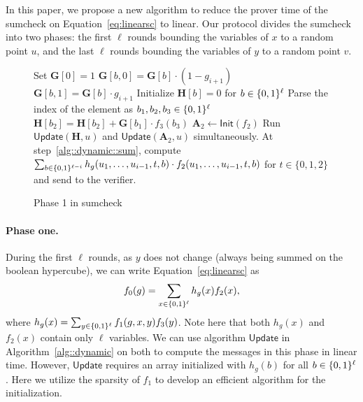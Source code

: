 In this paper, we propose a new algorithm to reduce the prover time of the sumcheck on Equation~\ref{eq:linearsc} to linear. Our protocol divides the sumcheck into two phases: the first $\ell$ rounds bounding the variables of $x$ to a random point $u$, and the last $\ell$ rounds bounding the variables of $y$ to a random point $v$.

\begin{figure}[b!]
	\begin{algorithm}[H]
		\caption{Phase 1 in sumcheck}\label{alg::phase1}
		\begin{algorithmic}[1]
			\State Set $\textbf{G}[0] = 1$
			\State $\textbf{G}[b,0] = \textbf{G}[b]\cdot(1-g_{i+1})$
			\State $\textbf{G}[b,1] = \textbf{G}[b]\cdot g_{i+1}$
			\EndFor
			\EndFor
			\EndProcedure
			\State Initialize $\textbf{H}[b] = 0$ for $b\in\{0,1\}^\ell$
			\State Parse the index of the element as $b_1,b_2,b_3\in\{0,1\}^\ell$
			\State\label{alg::phase1::init} $\textbf{H}[b_2] = \textbf{H}[b_2]+ \textbf{G}[b_1]\cdot f_3(b_3)$
			\EndFor
			\EndProcedure
			\State $\textbf{A}_2\leftarrow\mathsf{Init}(f_2)$
			\State Run $\mathsf{Update}(\textbf{H},u)$ and $\mathsf{Update}(\textbf{A}_2,u)$ simultaneously. At step~\ref{alg::dynamic::sum}, compute $\sum_{b\in\{0,1\}^{\ell-i}}h_g(u_1,\ldots, u_{i-1}, t, b)\cdot f_2(u_1,\ldots, u_{i-1}, t, b)$ for $t\in\{0,1,2\}$ and send to the verifier.
			\EndProcedure
		\end{algorithmic}
	\end{algorithm}
\end{figure}



\paragraph{Phase one.} 
During the first $\ell$ rounds, as $y$ does not change (always being summed on the boolean hypercube), we can write Equation~\ref{eq:linearsc} as 
\[
f_0(g) = \sum_{x\in\{0,1\}^\ell} h_g(x)f_2(x),
\]
where $h_g(x) = \sum_{y\in\{0,1\}^\ell}f_1(g,x,y)f_3(y)$. Note here that both $h_g(x)$ and $f_2(x)$ contain only $\ell$ variables. We can use algorithm $\mathsf{Update}$ in Algorithm~\ref{alg::dynamic} on both to compute the messages in this phase in linear time. However, $\mathsf{Update}$ requires an array initialized with $h_g(b)$ for all $b\in\{0,1\}^\ell$. Here we utilize the sparsity of $f_1$ to develop an efficient algorithm for the initialization.

